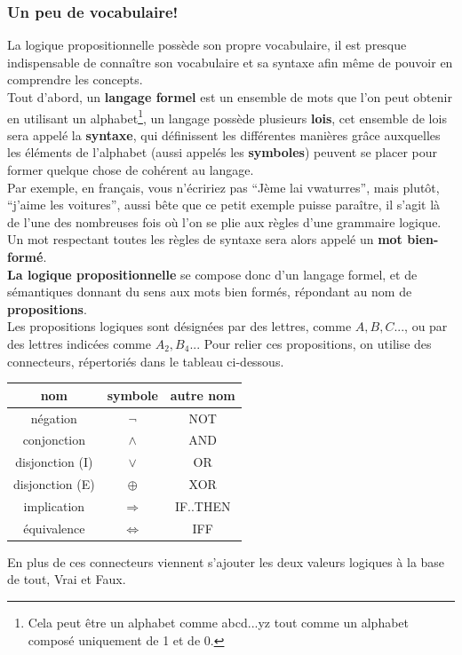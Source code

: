 \documentclass[a4paper, 12pt]{article}
\newcommand{\ffi}{\Leftrightarrow}
\newcommand{\imply}{\Rightarrow}
\numberwithin{equation}{subsection}
\begin{document}
  \subsubsection{Un peu de vocabulaire!}
     La logique propositionnelle possède son propre vocabulaire, il est presque indispensable de connaître son vocabulaire et sa syntaxe afin même de  pouvoir en comprendre les concepts.\\
     Tout d'abord, un {\bf langage formel} est un ensemble de mots que l'on peut obtenir en utilisant un alphabet\footnote{Cela peut être un alphabet comme abcd...yz tout comme un alphabet composé uniquement de 1 et de 0.}, un langage possède plusieurs {\bf lois}, cet ensemble de lois sera appelé la {\bf syntaxe}, qui définissent les différentes manières grâce auxquelles les éléments de l'alphabet (aussi appelés  les {\bf symboles}) peuvent se placer pour former quelque chose de cohérent au langage.\\ Par exemple, en français, vous n'écririez pas ``Jème lai vwaturres'', mais plutôt, ``j'aime les voitures'', aussi bête que ce petit exemple puisse paraître, il s'agit  là de l'une des nombreuses fois où l'on se plie aux règles d'une grammaire logique. \\
     Un mot respectant toutes les règles de syntaxe sera alors appelé un {\bf mot bien-formé}. \\
     {\bf La logique propositionnelle} se compose donc d'un langage formel, et de sémantiques donnant du sens aux mots bien formés, répondant au nom de {\bf propositions}. \\
     Les propositions logiques sont désignées par des lettres, comme $ A, B, C$..., ou par des lettres indicées comme $ A_2, B_{4}$...
     Pour relier ces propositions, on utilise des connecteurs, répertoriés dans le tableau ci-dessous. \\
     \begin{table}[H]
       \centering
       \begin{tabular}{|c|c|c|}
         \hline {\bf nom }       & {\bf symbole}     & {\bf autre nom}  \\
         \hline négation         & $\neg$            & NOT              \\
         conjonction             & $\land$           & AND              \\
         disjonction (I)         & $\lor$            & OR               \\
         disjonction (E)         & $\oplus$          & XOR              \\
         implication             & $\imply$          & IF..THEN         \\
         équivalence             & $\ffi$            & IFF              \\
         \hline
       \end{tabular}
    \end{table}
  En plus de ces connecteurs viennent s'ajouter les deux valeurs logiques à la base de tout, Vrai et Faux.
\end{document}
